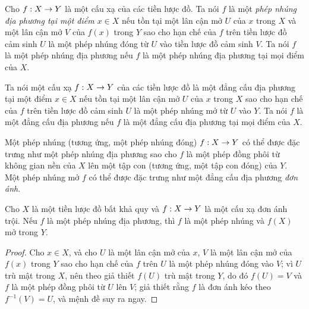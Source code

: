 \documentclass[oneside]{amsart}
\makeatletter
\newcommand{\ega@arrow}[2]{\mathchoice{#1}{#2}{#2}{#2}}
\renewcommand{\to}{\ega@arrow{\longrightarrow}{\rightarrow}}
\newcommand{\oldpage}[2][]{{\marginnote{\normalfont\textbf{#1}~|~#2}}\ignorespaces}
\let\EGAOriginalLabel\label
\renewcommand{\label}[1]{\phantomsection\EGAOriginalLabel{#1}}
\makeatother
\begin{document}
\begin{definition}[4.5.1]
\label{I.4.5.1}
Cho $f:X\to Y$ là một cấu xạ của các tiền lược đồ.
Ta nói $f$ là một \emph{phép nhúng địa phương tại một điểm $x\in X$} nếu tồn tại một lân cận mở $U$ của $x$ trong $X$ và một lân cận mở $V$ của $f(x)$ trong $Y$ sao cho hạn chế của $f$ trên tiền lược đồ cảm sinh $U$ là một phép nhúng đóng từ $U$ vào tiền lược đồ cảm sinh $V$.
Ta nói $f$ là một phép nhúng địa phương nếu $f$ là một phép nhúng địa phương tại mọi điểm của $X$.
\end{definition}

\begin{definition}[4.5.2]
\label{I.4.5.2}
Ta nói một cấu xạ $f:X\to Y$ của các tiền lược đồ là một đẳng cấu địa phương tại
\oldpage[I]{127}
một điểm $x\in X$ nếu tồn tại một lân cận mở $U$ của $x$ trong $X$ sao cho hạn chế của $f$ trên tiền lược đồ cảm sinh $U$ là một phép nhúng mở từ $U$ vào $Y$.
Ta nói $f$ là một đẳng cấu địa phương nếu $f$ là một đẳng cấu địa phương tại mọi điểm của $X$.
\end{definition}

\begin{env}[4.5.3]
\label{I.4.5.3}
Một phép nhúng (tương ứng, một phép nhúng đóng) $f:X\to Y$ có thể được đặc trưng như một phép nhúng địa phương sao cho $f$ là một phép đồng phôi từ không gian nền của $X$ lên một tập con (tương ứng, một tập con đóng) của $Y$.
Một phép nhúng mở $f$ có thể được đặc trưng như một đẳng cấu địa phương \emph{đơn ánh}.
\end{env}

\begin{proposition}[4.5.4]
\label{I.4.5.4}
Cho $X$ là một tiền lược đồ bất khả quy và $f:X\to Y$ là một cấu xạ đơn ánh trội.
Nếu $f$ là một phép nhúng địa phương, thì $f$ là một phép nhúng và $f(X)$ mở trong $Y$.
\end{proposition}

\begin{proof}
Cho $x\in X$, và cho $U$ là một lân cận mở của $x$, $V$ là một lân cận mở của $f(x)$ trong $Y$ sao cho hạn chế của $f$ trên $U$ là một phép nhúng đóng vào $V$;
vì $U$ trù mật trong $X$, nên theo giả thiết $f(U)$ trù mật trong $Y$, do đó $f(U)=V$ và $f$ là một phép đồng phôi từ $U$ lên $V$;
giả thiết rằng $f$ là đơn ánh kéo theo $f^{-1}(V)=U$, và mệnh đề suy ra ngay.
\end{proof}
\end{document}
